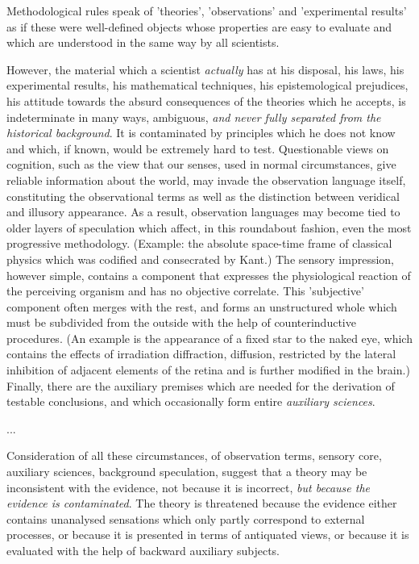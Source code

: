 \begin{longquote}

Methodological rules speak of 'theories', 'observations' and 'experimental results' as if these were well-defined objects
whose properties are easy to evaluate and which are understood in
the same way by all scientists.

However, the material which a scientist \textit{actually} has at his disposal,
his laws, his experimental results, his mathematical techniques, his
epistemological prejudices, his attitude towards the absurd consequences of the theories which he accepts, is indeterminate in many
ways, ambiguous, \textit{and never fully separated from the historical background}. It is contaminated by principles which he does not know
and which, if known, would be extremely hard to test. Questionable
views on cognition, such as the view that our senses, used in normal
circumstances, give reliable information about the world, may invade
the observation language itself, constituting the observational terms
as well as the distinction between veridical and illusory appearance.
As a result, observation languages may become tied to older layers of
speculation which affect, in this roundabout fashion, even the most
progressive methodology. (Example: the absolute space-time frame
of classical physics which was codified and consecrated by Kant.)
The sensory impression, however simple, contains a component that
expresses the physiological reaction of the perceiving organism and
has no objective correlate. This 'subjective' component often merges
with the rest, and forms an unstructured whole which must be
subdivided from the outside with the help of counterinductive
procedures. (An example is the appearance of a fixed star to the
naked eye, which contains the effects of irradiation diffraction,
diffusion, restricted by the lateral inhibition of adjacent elements of
the retina and is further modified in the brain.) Finally, there are the
auxiliary premises which are needed for the derivation of testable
conclusions, and which occasionally form entire \textit{auxiliary sciences}.

...

Consideration of all these circumstances, of observation terms,
sensory core, auxiliary sciences, background speculation, suggest
that a theory may be inconsistent with the evidence, not because it is
incorrect, \textit{but because the evidence is contaminated}. The theory is
threatened because the evidence either contains unanalysed sensations which only partly correspond to external processes, or because
it is presented in terms of antiquated views, or because it is evaluated
with the help of backward auxiliary subjects.


\end{longquote}
